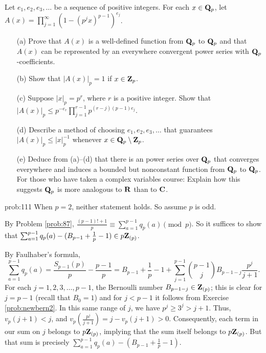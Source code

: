 \begin{challenge}\label{pp:noliouville} Let $e_1, e_2, e_3, \dots$ be a sequence of positive integers. For each $x \in \mathbf{Q}_p$, let $A(x) = \prod_{j=1}^{\infty} (1-(p^j x)^{p-1})^{e_j}$. 
\begin{enumerate}
\vspace{-0.12in}
\item[(a)] Prove that $A(x)$ is a well-defined function from $\mathbf{Q}_p$ to $\mathbf{Q}_p$ and that $A(x)$ can be represented by an everywhere convergent power series with $\mathbf{Q}_p$-coefficients.
\item[(b)] Show that $|A(x)|_p = 1$ if $x \in \mathbf{Z}_p$.
\item[(c)] Suppose $|x|_p = p^{r}$, where $r$ is a positive integer. Show that $|A(x)|_p \le p^{-e_r} \prod_{j=1}^{r-1} p^{(r-j)(p-1) e_j}$.
\item[(d)] Describe a method of choosing $e_1, e_2, e_3, \dots$ that guarantees $|A(x)|_p \le |x|_p^{-1}$ whenever $x \in \mathbf{Q}_p\setminus \mathbf{Z}_p$.
\item[(e)]  Deduce from (a)--(d) that there is an  power series over $\mathbf{Q}_p$ that converges everywhere and induces a bounded but nonconstant function from $\mathbf{Q}_p$ to $\mathbf{Q}_p$. For those who have taken a complex variables course: Explain how this suggests $\mathbf{Q}_p$ is more analogous to $\mathbf{R}$ than to $\mathbf{C}$.
\end{enumerate}
\end{challenge}


\begin{sol}{prob:111} When $p=2$, neither statement holds. So assume $p$ is odd.

By Problem \ref{prob:87}, $\frac{(p-1)!+1}{p} \equiv \sum_{a=1}^{p-1} q_p(a)\pmod{p}$. So it suffices to show that $\sum_{a=1}^{p-1} q_p(a) - (B_{p-1}+\frac{1}{p}-1) \in p \mathbf{Z}_{(p)}$.

By Faulhaber's formula, 
\[ \sum_{a=1}^{p-1} q_p(a) = \frac{S_{p-1}(p)}{p} -\frac{p-1}{p} = B_{p-1} + \frac{1}{p} -1 + \sum_{j=1}^{p-1} \binom{p-1}{j} B_{p-1-j} \frac{p^{j}}{j+1}.\]
For each $j=1,2,3,\dots,p-1$, the Bernoulli number $B_{p-1-j} \in \mathbf{Z}_{(p)}$; this is clear for $j=p-1$ (recall that $B_0=1$) and for $j < p-1$ it follows from Exercise \ref{prob:newbern2}. In this same range of $j$, we have $p^j \ge 3^j > j+1$. Thus, $v_p(j+1) < j$, and $v_p(\frac{p^j}{j+1}) = j - v_p(j+1) > 0$.  Consequently, each term in our sum on $j$ belongs to $p\mathbf{Z}_{(p)}$, implying that the sum itself belongs to $p\mathbf{Z}_{(p)}$. But that sum is precisely $\sum_{a=1}^{p-1} q_p(a) - (B_{p-1}+\frac{1}{p}-1)$.
\end{sol}

